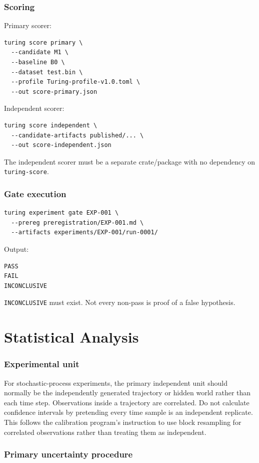 \documentclass[11pt]{article}
\begin{document}
\section{Scoring}

Primary scorer:
\begin{verbatim}
turing score primary \
  --candidate M1 \
  --baseline B0 \
  --dataset test.bin \
  --profile Turing-profile-v1.0.toml \
  --out score-primary.json
\end{verbatim}
Independent scorer:
\begin{verbatim}
turing score independent \
  --candidate-artifacts published/... \
  --out score-independent.json
\end{verbatim}
The independent scorer must be a separate crate/package with no dependency on \texttt{turing-score}.

\section{Gate execution}

\begin{verbatim}
turing experiment gate EXP-001 \
  --prereg preregistration/EXP-001.md \
  --artifacts experiments/EXP-001/run-0001/
\end{verbatim}
Output:
\begin{verbatim}
PASS
FAIL
INCONCLUSIVE
\end{verbatim}
\texttt{INCONCLUSIVE} must exist. Not every non-pass is proof of a false hypothesis.

\part{Statistical Analysis}

\section{Experimental unit}

For stochastic-process experiments, the primary independent unit should normally be the independently generated trajectory or hidden world rather than each time step. Observations inside a trajectory are correlated. Do not calculate confidence intervals by pretending every time sample is an independent replicate. This follows the calibration program's instruction to use block resampling for correlated observations rather than treating them as independent.

\section{Primary uncertainty procedure}
\end{document}
